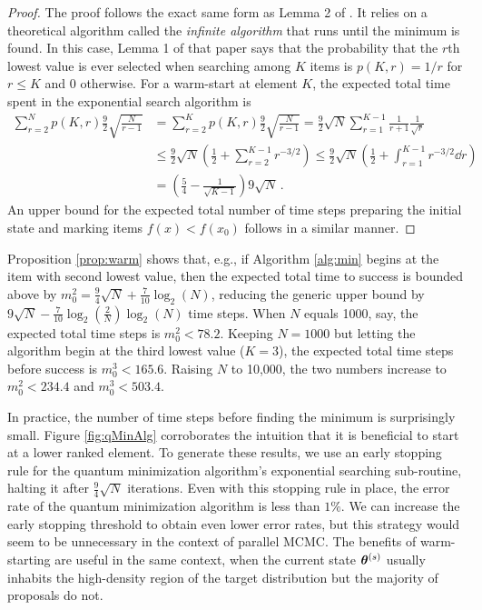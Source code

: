 \documentclass[12pt]{article} %
\begin{document}
\begin{proof}
	The proof follows the exact same form as Lemma 2 of \citet{durr1996quantum}. It relies on a theoretical algorithm called the \emph{infinite algorithm} that runs until the minimum is found.  In this case, Lemma 1 of that paper says that the probability that the $r$th lowest value is ever selected when searching among $K$ items is $p(K,r)=1/r$ for $r\leq K$ and 0 otherwise.  For a warm-start at element $K$, the expected total time spent in the exponential search algorithm is
	\begin{align*}
	\sum_{r=2}^N p(K,r) \frac{9}{2} \sqrt{\frac{N}{r-1}} &= \sum_{r=2}^K p(K,r) \frac{9}{2} \sqrt{\frac{N}{r-1}} 
	=  \frac{9}{2}\sqrt{N}\sum_{r=1}^{K-1} \frac{1}{r+1} \frac{1}{\sqrt{r}} \\
	&\leq \frac{9}{2}\sqrt{N}\left( \frac{1}{2}+\sum_{r=2}^{K-1} r^{-3/2} \right) \leq \frac{9}{2}\sqrt{N}\left( \frac{1}{2}+\int_{r=1}^{K-1} r^{-3/2} \dd r \right) \\
	&= \left(\frac{5}{4} - \frac{1}{\sqrt{K-1}} \right) 9\sqrt{N} \, .
	\end{align*}
	An upper bound for the expected total number of time steps preparing the initial state and marking items $f(x)<f(x_0)$ follows in a similar manner.
\end{proof}



Proposition \ref{prop:warm} shows that, e.g., if Algorithm \ref{alg:min} begins at the item with second lowest value, then the expected total time to success is bounded above by $m_0^2=\frac{9}{4}\sqrt{N}+\frac{7}{10}\log_2(N)$, reducing the generic upper bound by $9\sqrt{N}-\frac{7}{10}\log_2\left( \frac{2}{N}\right)\log_2(N)$ time steps.  When $N$ equals 1000, say, the expected total time steps is $m_0^2< 78.2$.  Keeping $N=1000$ but letting the algorithm begin at the third lowest value ($K=3$), the expected total time steps before success is $m_0^3<165.6$. Raising $N$ to 10,000, the two numbers increase to $m_0^2< 234.4$ and $m_0^3<503.4$.  

In practice, the number of time steps before finding the minimum is surprisingly small.  Figure \ref{fig:qMinAlg} corroborates the intuition that it is beneficial to start at a lower ranked element. To generate these results, we use an early stopping rule for the quantum minimization algorithm's exponential searching sub-routine, halting it after $\frac{9}{4}\sqrt{N}$ iterations. Even with this stopping rule in place, the error rate of the quantum minimization algorithm is less than $1\%$. We can increase the early stopping threshold to obtain even lower error rates, but this strategy would seem to be unnecessary in the context of parallel MCMC.  The benefits of warm-starting are useful in the same context, when the current state $\boldsymbol{\theta}^{(s)}$ usually inhabits the high-density region of the target distribution but the majority of proposals do not.  
\end{document}
